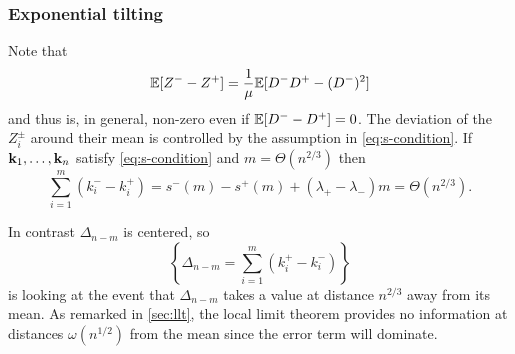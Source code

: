 \subsubsection{Exponential tilting}

Note that
\begin{equation*}
    {\mathbb E}[Z^- - Z^+] = \frac{1}{\mu} {\mathbb E}[D^-D^+ - (D^-)^2]
\end{equation*}
and thus is, in general, non-zero even if ${\mathbb E}[D^- - D^+] = 0$. The deviation of the $Z^{\pm}_i$ around their mean is controlled by the assumption in \cref{eq:s-condition}. If ${\mathbf k}_1, \ldots, {\mathbf k}_n$ satisfy \cref{eq:s-condition} and $m = \Theta(n^{2/3})$ then
\begin{equation*}
    \sum_{i=1}^m (k_i^- - k_i^+) = s^-(m) - s^+(m) + (\lambda_+ - \lambda_-) m = \Theta(n^{2/3}).
\end{equation*}

In contrast $\Delta_{n-m}$ is centered, so
\begin{equation*}
    \left\{ \Delta_{n-m} = \textstyle \sum_{i=1}^m (k_i^+ - k_i^-) \right\}  
\end{equation*}
is looking at the event that $\Delta_{n-m}$ takes a value at distance $n^{2/3}$ away from its mean. As remarked in \cref{sec:llt}, the local limit theorem provides no information at distances $\omega(n^{1/2})$ from the mean since the error term will dominate.

